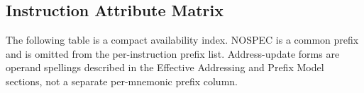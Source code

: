 \subsection{Instruction Attribute Matrix}
The following table is a compact availability index. NOSPEC is a common prefix and is omitted from the
per-instruction prefix list. Address-update forms are operand spellings described in the Effective Addressing
and Prefix Model sections, not a separate per-mnemonic prefix column.\par
